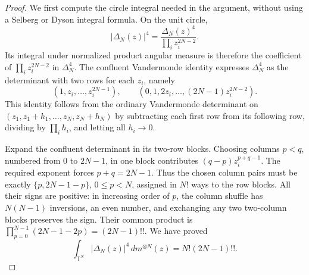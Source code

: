 \documentclass[11pt,a4paper]{article}
\numberwithin{equation}{section}
\theoremstyle{definition}
\theoremstyle{remark}
\begin{document}
\begin{proof}
We first compute the circle integral needed in the argument, without
using a Selberg or Dyson integral formula. On the unit circle,
\[
 |\Delta_N(z)|^4
 =\frac{\Delta_N(z)^4}{\prod_i z_i^{2N-2}}.
\]
Its integral under normalized product angular measure is therefore the
coefficient of $\prod_i z_i^{2N-2}$ in $\Delta_N^4$.
The confluent Vandermonde identity expresses $\Delta_N^4$ as the
determinant with two rows for each $z_i$, namely
\[
 (1,z_i,\ldots,z_i^{2N-1}),\qquad
 (0,1,2z_i,\ldots,(2N-1)z_i^{2N-2}).
\]
This identity follows from the ordinary Vandermonde determinant on
$(z_1,z_1+h_1,\ldots,z_N,z_N+h_N)$ by subtracting each first row
from its following row, dividing by $\prod_i h_i$, and letting all
$h_i\to0$.

Expand the confluent determinant in its two-row blocks. Choosing columns
$p<q$, numbered from $0$ to $2N-1$, in one block contributes
$(q-p)z_i^{p+q-1}$. The required exponent forces $p+q=2N-1$.
Thus the chosen column pairs must be exactly
$\{p,2N-1-p\}$, $0\leq p<N$, assigned in $N!$ ways to the row blocks.
All their signs are positive: in increasing order of $p$, the column
shuffle has $N(N-1)$ inversions, an even number, and exchanging any two
two-column blocks preserves the sign. Their common product is
$\prod_{p=0}^{N-1}(2N-1-2p)=(2N-1)!!$. We have proved
\begin{equation}
 \int_{\mathbb T^N}|\Delta_N(z)|^4\,dm^{\otimes N}(z)
 =N!(2N-1)!!.
 \label{eq:critical-circle-elementary-integral}
\end{equation}


\end{proof}
\end{document}
